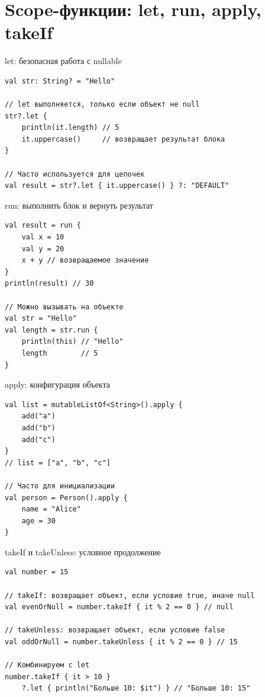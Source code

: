 \documentclass[aspectratio=169]{beamer}
\begin{document}
\section{Scope-функции: let, run, apply, takeIf}

\begin{frame}[fragile]{let: безопасная работа с nullable}
\lstset{language=Kotlin}
\begin{lstlisting}
val str: String? = "Hello"

// let выполняется, только если объект не null
str?.let { 
    println(it.length) // 5
    it.uppercase()     // возвращает результат блока
}

// Часто используется для цепочек
val result = str?.let { it.uppercase() } ?: "DEFAULT"
\end{lstlisting}
\end{frame}

\begin{frame}[fragile]{run: выполнить блок и вернуть результат}
\lstset{language=Kotlin}
\begin{lstlisting}
val result = run {
    val x = 10
    val y = 20
    x + y // возвращаемое значение
}
println(result) // 30

// Можно вызывать на объекте
val str = "Hello"
val length = str.run {
    println(this) // "Hello"
    length        // 5
}
\end{lstlisting}
\end{frame}

\begin{frame}[fragile]{apply: конфигурация объекта}
\lstset{language=Kotlin}
\begin{lstlisting}
val list = mutableListOf<String>().apply {
    add("a")
    add("b")
    add("c")
}
// list = ["a", "b", "c"]

// Часто для инициализации
val person = Person().apply {
    name = "Alice"
    age = 30
}
\end{lstlisting}
\end{frame}

\begin{frame}[fragile]{takeIf и takeUnless: условное продолжение}
\lstset{language=Kotlin}
\begin{lstlisting}
val number = 15

// takeIf: возвращает объект, если условие true, иначе null
val evenOrNull = number.takeIf { it % 2 == 0 } // null

// takeUnless: возвращает объект, если условие false
val oddOrNull = number.takeUnless { it % 2 == 0 } // 15

// Комбинируем с let
number.takeIf { it > 10 }
    ?.let { println("Больше 10: $it") } // "Больше 10: 15"
\end{lstlisting}
\end{frame}
\end{document}
